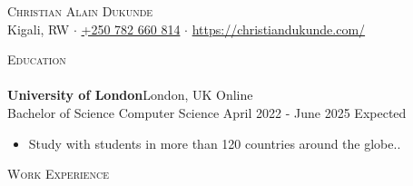 \documentclass[a4paper]{article}
\newcommand{\lineunder} {
    \vspace*{-8pt} \\
    \hspace*{-18pt} \hrulefill \\
}
\newcommand{\header} [1] {
    {\hspace*{-18pt}\vspace*{6pt} \textsc{#1}}
    \vspace*{-6pt} \lineunder
}
\begin{document}
\vspace*{-40pt}



\vspace*{-10pt}
\begin{center}
	{\Huge \scshape {Christian Alain Dukunde}}\\
	Kigali, RW $\cdot$ \href{tel:+250782660814}{+250 782 660 814} $\cdot$ \url{https://christiandukunde.com/}\\
\end{center}

\header{Education}
\textbf{University of London}\hfill London, UK Online\\
Bachelor of Science Computer Science \hfill April 2022 - June 2025 Expected\\
\begin{itemize} \itemsep 1pt
	\item Study with students in more than 120 countries around the globe.\textquotedbl{}.
\end{itemize}
\vspace{2mm}

\header{Work Experience}
\vspace{1mm}
\end{document}
